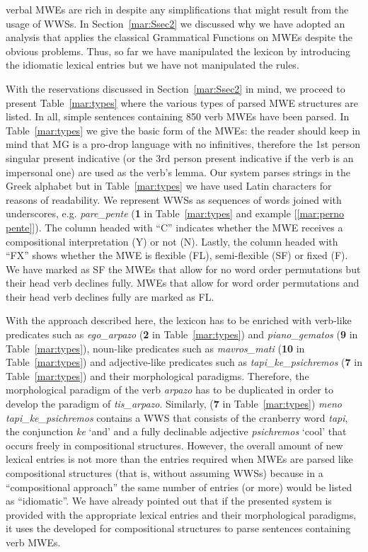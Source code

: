 \documentclass[output=paper]{langsci/langscibook}
\begin{document}
 verbal MWEs are rich in  despite any simplifications that might result from the usage of WWSs. In Section~\ref{mar:Ssec2} we discussed why we have adopted an  analysis that applies the classical  Grammatical Functions on MWEs despite the obvious problems. Thus, so far we have manipulated the lexicon by introducing the idiomatic lexical entries but we have not manipulated the  rules.

With the reservations discussed in Section~\ref{mar:Ssec2} in mind, we proceed to present Table~\ref{mar:types} where the various types of parsed MWE structures are listed. In all, simple sentences containing 850 verb MWEs have been parsed. In Table~\ref{mar:types} we give the basic form of the MWEs: the reader should keep in mind that MG is a pro-drop language with no infinitives, therefore the 1st person singular present indicative (or the 3rd person present indicative if the verb is an impersonal one) are used as the verb's lemma. Our system parses strings in the Greek alphabet but in Table~\ref{mar:types} we have used Latin characters for reasons of readability. We represent WWSs as sequences of words joined with underscores, e.g. \emph{pare\_pente} (\textbf{1} in Table~\ref{mar:types} and example [\ref{mar:perno pente}]). The column headed with ``C'' indicates whether the MWE receives a compositional interpretation (Y) or not (N). Lastly, the column headed with ``FX'' shows whether the MWE is flexible (FL), semi-flexible (SF) or fixed (F). We have marked as SF the MWEs that allow for no word order permutations but their head verb declines fully. MWEs that allow for word order permutations and their head verb declines fully are marked as FL.

With the approach described here, the lexicon has to be enriched with verb-like predicates such as \emph{ego\_arpazo} (\textbf{2} in Table~\ref{mar:types}) and \emph{piano\_gematos} (\textbf{9} in Table~\ref{mar:types}), noun-like predicates such as \emph{mavros\_mati} (\textbf{10} in Table~\ref{mar:types}) and adjective-like predicates such as \emph{tapi\_ke\_psichremos} (\textbf{7} in Table~\ref{mar:types}) and their morphological para\-digms. Therefore, the morphological paradigm of the verb \textit{arpazo} has to be duplicated in order to develop the paradigm of \emph{tis\_arpazo}. Similarly,  (\textbf{7} in Table~\ref{mar:types}) \emph{meno tapi\_ke\_psichremos} contains a WWS that consists of the cranberry word \textit{tapi}, the conjunction \textit{ke} `and' and a fully declinable adjective \textit{psichremos} `cool' that occurs freely in compositional structures. However, the overall amount of new lexical entries is not more than the entries required when MWEs are parsed like compositional structures (that is, without assuming WWSs) because in a ``compositional approach'' the same number of entries (or more) would be listed as ``idiomatic''. We have already pointed out that if the presented system is provided with the appropriate lexical entries and their morphological paradigms, it uses the  developed for compositional structures to parse sentences containing verb MWEs. 
\end{document}
